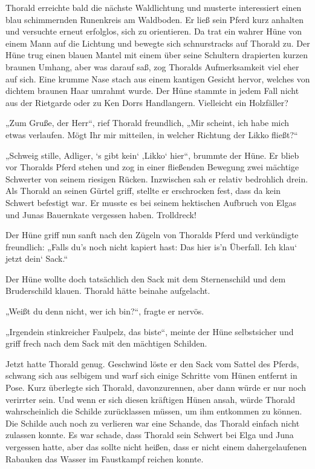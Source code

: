 \trennzeichen



Thorald erreichte bald die nächste Waldlichtung und musterte interessiert einen blau schimmernden Runenkreis am Waldboden. Er ließ sein Pferd kurz anhalten und versuchte erneut erfolglos, sich zu orientieren. Da trat ein wahrer Hüne von einem Mann auf die Lichtung und bewegte sich schnurstracks auf Thorald zu. Der Hüne trug einen blauen Mantel mit einem über seine Schultern drapierten kurzen braunen Umhang, aber was darauf saß, zog Thoralds Aufmerksamkeit viel eher auf sich. Eine krumme Nase stach aus einem kantigen Gesicht hervor, welches von dichtem braunen Haar umrahmt wurde. Der Hüne stammte in jedem Fall nicht aus der Rietgarde oder zu Ken Dorrs Handlangern. Vielleicht ein Holzfäller?

„Zum Gruße, der Herr“, rief Thorald freundlich, „Mir scheint, ich habe mich etwas verlaufen. Mögt Ihr mir mitteilen, in welcher Richtung der Likko fließt?“

„Schweig stille, Adliger, ‘s gibt kein‘ ‚Likko‘ hier“, brummte der Hüne. Er blieb vor Thoralds Pferd stehen und zog in einer fließenden Bewegung zwei mächtige Schwerter von seinem riesigen Rücken. Inzwischen sah er relativ bedrohlich drein. Als Thorald an seinen Gürtel griff, stellte er erschrocken fest, dass da kein Schwert befestigt war. Er musste es bei seinem hektischen Aufbruch von Elgas und Junas Bauernkate vergessen haben. Trolldreck!

Der Hüne griff nun sanft nach den Zügeln von Thoralds Pferd und verkündigte freundlich: „Falls du’s noch nicht kapiert hast: Das hier is’n Überfall. Ich klau‘ jetzt dein‘ Sack.“

Der Hüne wollte doch tatsächlich den Sack mit dem Sternenschild und dem Bruderschild klauen. Thorald hätte beinahe aufgelacht.

„Weißt du denn nicht, wer ich bin?“, fragte er nervös.

„Irgendein stinkreicher Faulpelz, das biste“, meinte der Hüne selbstsicher und griff frech nach dem Sack mit den mächtigen Schilden.

Jetzt hatte Thorald genug. Geschwind löste er den Sack vom Sattel des Pferds, schwang sich aus selbigem und warf sich einige Schritte vom Hünen entfernt in Pose. Kurz überlegte sich Thorald, davonzurennen, aber dann würde er nur noch verirrter sein. Und wenn er sich diesen kräftigen Hünen ansah, würde Thorald wahrscheinlich die Schilde zurücklassen müssen, um ihm entkommen zu können. Die Schilde auch noch zu verlieren war eine Schande, das Thorald einfach nicht zulassen konnte. Es war schade, dass Thorald sein Schwert bei Elga und Juna vergessen hatte, aber das sollte nicht heißen, dass er nicht einem dahergelaufenen Rabauken das Wasser im Faustkampf reichen konnte.

